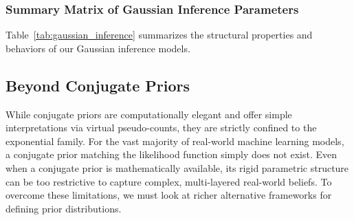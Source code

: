 \documentclass{article}
\begin{document}
\subsubsection{Summary Matrix of Gaussian Inference Parameters}
Table~\ref{tab:gaussian_inference} summarizes the structural properties and behaviors of our Gaussian inference models.

\begin{table}[htbp]
\centering
\small
\renewcommand{\arraystretch}{1.3}
\caption{Parameter Architecture for Univariate and Multivariate Gaussian-Gaussian Inference Models}
\label{tab:gaussian_inference}
\end{table}

\subsection{Beyond Conjugate Priors}

While conjugate priors are computationally elegant and offer simple interpretations via virtual pseudo-counts, they are strictly confined to the exponential family. For the vast majority of real-world machine learning models, a conjugate prior matching the likelihood function simply does not exist. Even when a conjugate prior is mathematically available, its rigid parametric structure can be too restrictive to capture complex, multi-layered real-world beliefs. To overcome these limitations, we must look at richer alternative frameworks for defining prior distributions.
\end{document}
